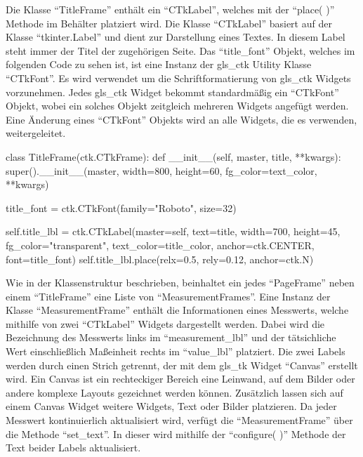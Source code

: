 Die Klasse \enquote{TitleFrame} enthält ein \enquote{CTkLabel}, welches mit der \enquote{place( )} Methode im Behälter platziert wird. Die Klasse \enquote{CTkLabel} basiert auf der Klasse \enquote{tkinter.Label} und dient zur Darstellung eines Textes. In diesem Label steht immer der Titel der zugehörigen Seite. Das \enquote{title\_font} Objekt, welches im folgenden Code zu sehen ist, ist eine Instanz der \gls{gls_ctk} Utility Klasse \enquote{CTkFont}. Es wird verwendet um die Schriftformatierung von \gls{gls_ctk} Widgets vorzunehmen. Jedes \gls{gls_ctk} Widget bekommt standardmäßig ein \enquote{CTkFont} Objekt, wobei ein solches Objekt zeitgleich mehreren Widgets angefügt werden. Eine Änderung eines \enquote{CTkFont} Objekts wird an alle Widgets, die es verwenden, weitergeleitet. \cite[vgl.][]{Schimansky:o.J.}

\begin{pythoncode}
class TitleFrame(ctk.CTkFrame):
	def __init__(self, master, title, **kwargs):
		super().__init__(master, width=800, height=60, fg_color=text_color, **kwargs)
		
		title_font = ctk.CTkFont(family="Roboto", size=32)
		
		self.title_lbl = ctk.CTkLabel(master=self, text=title, width=700, height=45, fg_color="transparent", text_color=title_color, anchor=ctk.CENTER, font=title_font)
		self.title_lbl.place(relx=0.5, rely=0.12, anchor=ctk.N)
\end{pythoncode}

Wie in der Klassenstruktur beschrieben, beinhaltet ein jedes \enquote{PageFrame} neben einem \enquote{TitleFrame} eine Liste von \enquote{MeasurementFrames}. Eine Instanz der Klasse \enquote{MeasurementFrame} enthält die Informationen eines Messwerts, welche mithilfe von zwei \enquote{CTkLabel} Widgets dargestellt werden. Dabei wird die Bezeichnung des Messwerts links im \enquote{measurement\_lbl} und der tätsichliche Wert einschließlich Maßeinheit rechts im \enquote{value\_lbl} platziert. Die zwei Labels werden durch einen Strich getrennt, der mit dem \gls{gls_tk} Widget \enquote{Canvas} erstellt wird. Ein Canvas ist ein rechteckiger Bereich \bzw eine Leinwand, auf dem Bilder oder andere komplexe Layouts gezeichnet werden können. Zusätzlich lassen sich auf einem Canvas Widget \zB weitere Widgets, Text oder Bilder platzieren. \cite[vgl.][20]{Shipman:2013} 
\newline Da jeder Messwert kontinuierlich aktualisiert wird, verfügt die \enquote{MeasurementFrame} über die Methode \enquote{set\_text}. In dieser wird mithilfe der \enquote{configure( )} Methode der Text beider Labels aktualisiert. 

